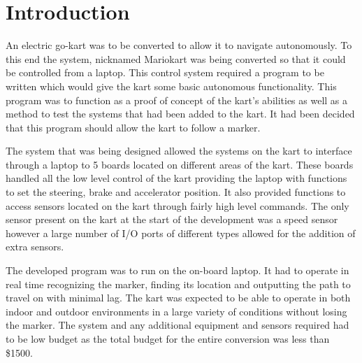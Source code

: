 \section{Introduction}

An electric go-kart was to be converted to allow it to navigate autonomously. To this end the system, nicknamed Mariokart was being converted so that it could be controlled from a laptop. This control system required a program to be written which would give the kart some basic autonomous functionality. This program was to function as a proof of concept of the kart’s abilities as well as a method to test the systems that had been added to the kart. It had been decided that this program should allow the kart to follow a marker. 

The system that was being designed allowed the systems on the kart to interface through a laptop to 5 boards located on different areas of the kart. These boards handled all the low level control of the kart providing the laptop with functions to set the steering, brake and accelerator position. It also provided functions to access sensors located on the kart through fairly high level commands. The only sensor present on the kart at the start of the development was a speed sensor however a large number of I/O ports of different types allowed for the addition of extra sensors.  

The developed program was to run on the on-board laptop. It had to operate in real time recognizing the marker, finding its location and outputting the path to travel on with minimal lag. The kart was expected to be able to operate in both indoor and outdoor environments in a large variety of conditions without losing the marker. The system and any additional equipment and sensors required had to be low budget as the total budget for the entire conversion was less than \$1500.